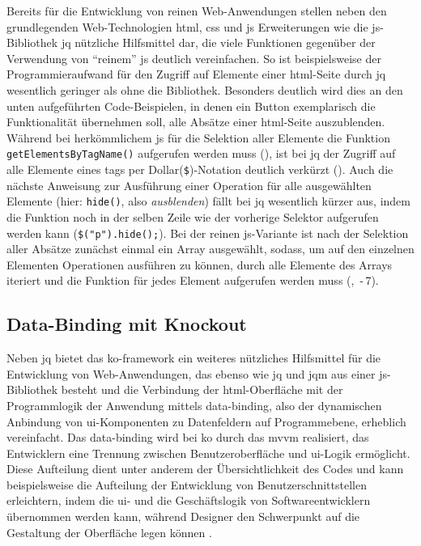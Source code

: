 Bereits für die Entwicklung von reinen Web-Anwendungen stellen neben den grundlegenden Web-Technologien \gls{html}, \gls{css} und \gls{js} Erweiterungen wie die \gls{js}-Bibliothek \gls{jq} nützliche Hilfsmittel dar, die viele Funktionen gegenüber der Verwendung von \enquote{reinem} \gls{js} deutlich vereinfachen.
So ist beispielsweise der Programmieraufwand für den Zugriff auf Elemente einer \gls{html}-Seite durch \gls{jq} wesentlich geringer als ohne die Bibliothek.
Besonders deutlich wird dies an den unten aufgeführten Code-Beispielen, in denen ein Button exemplarisch die Funktionalität übernehmen soll, alle Absätze einer \gls{html}-Seite auszublenden.
Während bei herkömmlichem \gls{js} für die Selektion aller Elemente die Funktion \lstinline|getElementsByTagName()| aufgerufen werden muss (), ist bei \gls{jq} der Zugriff auf alle Elemente eines \glspl{tag} per Dollar(\lstinline|$|)-Notation deutlich verkürzt ().
Auch die nächste Anweisung zur Ausführung einer Operation für alle ausgewählten Elemente (hier: \lstinline|hide()|, also \textit{ausblenden}) fällt bei \gls{jq} wesentlich kürzer aus, indem die Funktion noch in der selben Zeile wie der vorherige Selektor aufgerufen werden kann (\lstinline|$("p").hide();|).
Bei der reinen \gls{js}-Variante ist nach der Selektion aller Absätze zunächst einmal ein Array ausgewählt, sodass, um auf den einzelnen Elementen Operationen ausführen zu können, durch alle Elemente des Arrays iteriert und die Funktion für jedes Element aufgerufen werden muss (, \,-\,7).


	

\subsection{Data-Binding mit Knockout} \label{sec:ko}
Neben \gls{jq} bietet das \gls{ko}-\gls{framework} ein weiteres nützliches Hilfsmittel für die Entwicklung von Web-Anwendungen, das ebenso wie \gls{jq} und \gls{jqm} aus einer \gls{js}-Bibliothek besteht und die Verbindung der \gls{html}-Oberfläche mit der Programmlogik der Anwendung mittels \gls{data-binding}, also der dynamischen Anbindung von \gls{ui}-Komponenten zu Datenfeldern auf Programmebene, erheblich vereinfacht.
Das \gls{data-binding} wird bei \gls{ko} durch das \gls{mvvm} realisiert, das Entwicklern eine Trennung zwischen Benutzeroberfläche und \gls{ui}-Logik ermöglicht.
Diese Aufteilung dient unter anderem der Übersichtlichkeit des Codes und kann beispielsweise die Aufteilung der Entwicklung von Benutzerschnittstellen erleichtern, indem die \gls{ui}- und die Geschäftslogik von Softwareentwicklern übernommen werden kann, während Designer den Schwerpunkt auf die Gestaltung der Oberfläche legen können \cite{Model_View_ViewModel__Wikipedia}.

